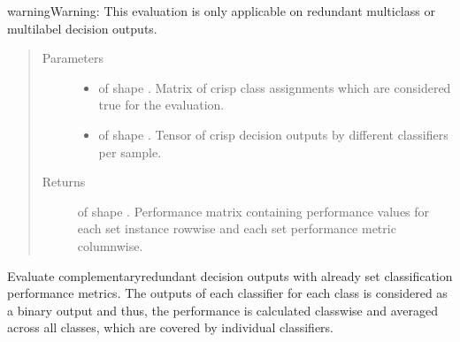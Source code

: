 \documentclass[letterpaper,10pt,english]{sphinxmanual}
\begin{document}
\begin{fulllineitems}
\begin{fulllineitems}
\begin{sphinxadmonition}{warning}{Warning:}
\sphinxAtStartPar
This evaluation is only applicable on redundant multiclass or multilabel decision outputs.
\end{sphinxadmonition}
\begin{quote}\begin{description}
\item[{Parameters}] \leavevmode\begin{itemize}
\item {} 
\sphinxAtStartPar
{} \textendash{}  of shape .
Matrix of crisp class assignments which are considered true for the evaluation.

\item {} 
\sphinxAtStartPar
{} \textendash{}  of shape .
Tensor of crisp decision outputs by different classifiers per sample.

\end{itemize}

\item[{Returns}] \leavevmode
\sphinxAtStartPar
{} of shape . Performance matrix containing performance values
for each set instance row\sphinxhyphen{}wise and each set performance metric column\sphinxhyphen{}wise.

\end{description}\end{quote}

\end{fulllineitems}


\begin{fulllineitems}
\label{\detokenize{pusion.evaluation.evaluation:pusion.evaluation.evaluation.Evaluation.evaluate_cr_decision_outputs}}
\sphinxAtStartPar
Evaluate complementary\sphinxhyphen{}redundant decision outputs with already set classification performance metrics.
The outputs of each classifier for each class is considered as a binary output and thus, the performance is
calculated class\sphinxhyphen{}wise and averaged across all classes, which are covered by individual classifiers.


\end{fulllineitems}
\end{fulllineitems}
\end{document}
